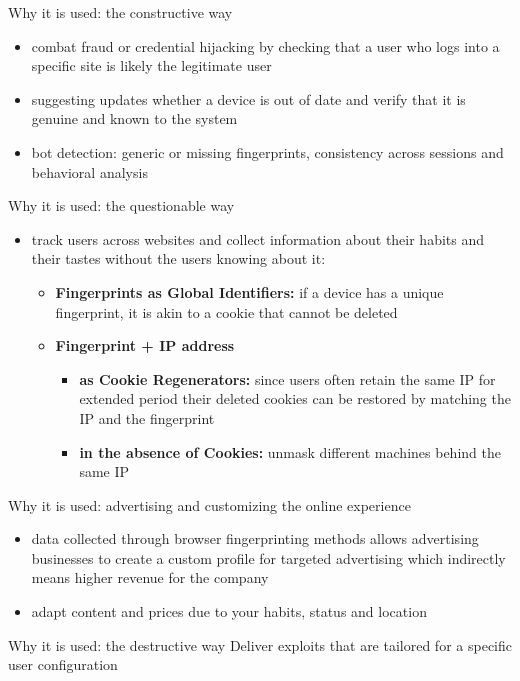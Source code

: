 \begin{frame}{Why it is used: the constructive way}
  \begin{itemize}
    \item combat fraud or credential hijacking by checking that a user who logs into a specific site is likely the legitimate user
    \item suggesting updates whether a device is out of date and verify that it is genuine and known to the system
    \item bot detection: generic or missing fingerprints, consistency across sessions and behavioral analysis
  \end{itemize}
\end{frame}

\begin{frame}{Why it is used: the questionable way}
  \begin{itemize}
    \item track users across websites and collect information about their habits and their tastes without the users knowing about it:
      \begin{itemize}
        \item \textbf{Fingerprints as Global Identifiers:} if a device has a unique fingerprint, it is akin to a cookie that cannot be deleted
        \item \textbf{Fingerprint + IP address}
          \begin{itemize}
            \item \textbf{as Cookie Regenerators:} since users often retain the same IP for extended period their deleted cookies can be restored by matching the IP and the fingerprint
            \item \textbf{in the absence of Cookies:} unmask different machines behind the same IP
          \end{itemize}
      \end{itemize}
  \end{itemize}
\end{frame}

\begin{frame}{Why it is used: advertising and customizing the online experience}
  \begin{itemize}
  \item data collected through browser fingerprinting methods allows advertising businesses to create a custom profile for targeted advertising which indirectly means higher revenue for the company
  \item adapt content and prices due to your habits, status and location
  \end{itemize}
\end{frame}

\begin{frame}{Why it is used: the destructive way}
  Deliver exploits that are tailored for a specific user configuration
\end{frame}
